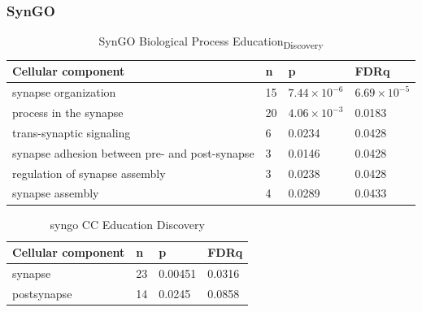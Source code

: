   \subsubsection{SynGO}
  \begin{table}[]
    \centering
    \begin{tabular}{llll}
    \toprule
    Cellular component & n & p & FDRq\\
    \midrule
    synapse organization&	15&	$7.44\times10^{-6}$&	$6.69\times10^{-5}$\\

process in the synapse&	20	&$4.06\times10^{-3}$	&0.0183\\
trans-synaptic signaling&	6&	0.0234&	0.0428\\
synapse adhesion between pre- and post-synapse&	3	&0.0146&	0.0428\\
regulation of synapse assembly&	3&	0.0238&	0.0428\\

synapse assembly&	4&	0.0289	&0.0433\\
      \bottomrule  
    \end{tabular}
    \caption{SynGO Biological Process Education\textsubscript{Discovery}}
    \label{tab:syngo biological process education discovery}
\end{table}
  
  \begin{table}[]
    \centering
    \begin{tabular}{llll}
    \toprule
    Cellular component & n & p & FDRq\\
    \midrule
 synapse&	23&	0.00451&	0.0316\\
postsynapse	&14	&0.0245&	0.0858\\
\bottomrule
\end{tabular}
\caption{syngo CC Education Discovery}
\label{tab:syngo CC Education discovery}
\end{table}
            
            
